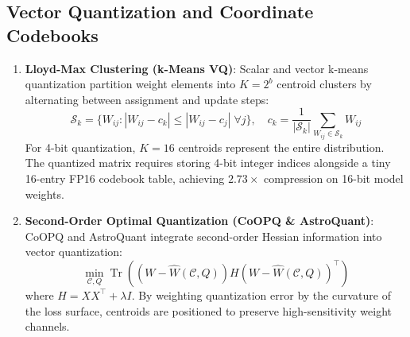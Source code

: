 \documentclass{article}
\begin{document}
\subsection{Vector Quantization and Coordinate Codebooks}
\begin{enumerate}
    \item \textbf{Lloyd-Max Clustering (k-Means VQ)}:
    Scalar and vector k-means quantization \citep{stock2020and} partition weight elements into $K = 2^b$ centroid clusters by alternating between assignment and update steps:
    \begin{equation}
        \mathcal{S}_k = \{ W_{ij} : |W_{ij} - c_k| \le |W_{ij} - c_j| \; \forall j \}, \quad c_k = \frac{1}{|\mathcal{S}_k|} \sum_{W_{ij} \in \mathcal{S}_k} W_{ij}
    \end{equation}
    For 4-bit quantization, $K=16$ centroids represent the entire distribution. The quantized matrix requires storing 4-bit integer indices alongside a tiny 16-entry FP16 codebook table, achieving $2.73\times$ compression on 16-bit model weights.
    \item \textbf{Second-Order Optimal Quantization (CoOPQ \& AstroQuant)}:
    CoOPQ and AstroQuant integrate second-order Hessian information into vector quantization:
    \begin{equation}
        \min_{\mathcal{C}, Q} \operatorname{Tr}\left( (W - \hat{W}(\mathcal{C}, Q)) H (W - \hat{W}(\mathcal{C}, Q))^\top \right)
    \end{equation}
    where $H = X X^\top + \lambda I$. By weighting quantization error by the curvature of the loss surface, centroids are positioned to preserve high-sensitivity weight channels.
\end{enumerate}
\end{document}
